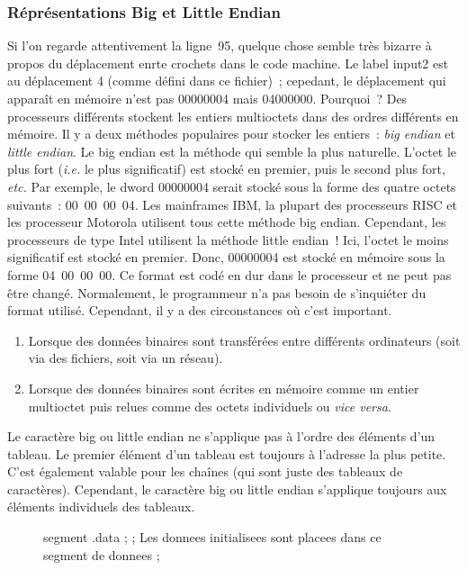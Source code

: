 {\subsubsection{Réprésentations Big et Little Endian }

Si l'on regarde attentivement la ligne~95, quelque chose semble très bizarre
à propos du déplacement enrte crochets dans le code machine. Le label
{\code input2} est au déplacement 4 (comme défini dans ce fichier)~; cepedant,
le déplacement qui apparaît en mémoire n'est pas 00000004 mais 04000000. 
Pourquoi~? Des processeurs différents stockent les entiers multioctets dans
des ordres différents en mémoire. Il y a deux méthodes populaires pour
stocker les entiers~: \emph{big endian} et \emph{little endian}.
 Le big endian est la méthode
qui semble la plus naturelle. L'octet le plus fort (\emph{i.e.} le plus significatif)
est stocké en premier, puis le second plus fort, \emph{etc.} Par exemple,
le dword 00000004 serait stocké sous la forme des quatre octets suivants~: 00~00~00~04. 
Les mainframes IBM, la plupart des processeurs RISC et les processeur Motorola utilisent
tous cette méthode big endian. Cependant, les processeurs de type Intel utilisent
la méthode little endian~! Ici, l'octet le moins significatif est stocké en premier.
Donc, 00000004 est stocké en mémoire sous la forme 04~00~00~00. Ce format est
codé en dur dans le processeur et ne peut pas être changé. Normalement, le programmeur n'a
pas besoin de s'inquiéter du format utilisé. Cependant, il y a des circonstances
où c'est important.
\begin{enumerate}
\item Lorsque des données binaires sont transférées entre différents ordinateurs (soit
	via des fichiers, soit via un réseau).
\item Lorsque des données binaires sont écrites en mémoire comme un entier multioctet puis
	relues comme des octets individuels ou \emph{vice versa}.
\end{enumerate}

Le caractère big ou little endian ne s'applique pas à l'ordre des éléments d'un tableau.
Le premier élément d'un tableau est toujours à l'adresse la plus petite. C'est également
valable pour les chaînes (qui sont juste des tableaux de caractères). Cependant, le caractère
big ou little endian s'applique toujours aux éléments individuels des tableaux.

\begin{figure}[t]
\begin{AsmCodeListing}[label=skel.asm]
segment .data
;
; Les donnees initialisees sont placees dans ce segment de donnees
;


\end{AsmCodeListing}
\end{figure}}
